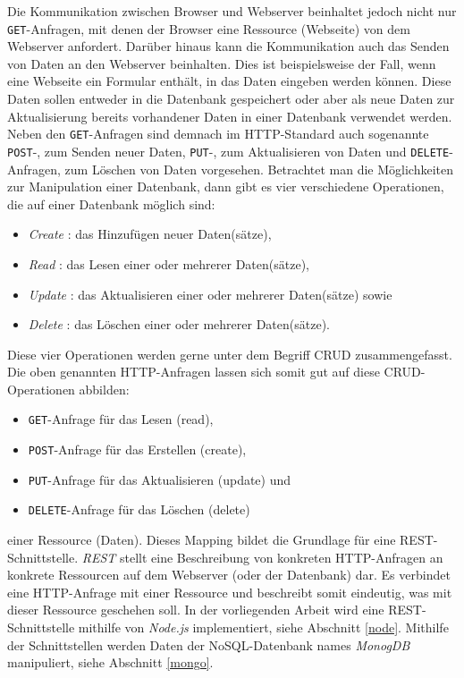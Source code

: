 Die Kommunikation zwischen Browser und Webserver beinhaltet jedoch nicht nur \texttt{GET}-Anfragen, mit denen der Browser eine Ressource (Webseite) von dem Webserver anfordert. Darüber hinaus kann die Kommunikation auch das Senden von Daten an den Webserver beinhalten. Dies ist beispielsweise der Fall, wenn eine Webseite ein Formular enthält, in das Daten eingeben werden können. Diese Daten sollen entweder in die Datenbank gespeichert oder aber als neue Daten zur Aktualisierung bereits vorhandener Daten in einer Datenbank verwendet werden. Neben den \texttt{GET}-Anfragen sind demnach im HTTP-Standard auch sogenannte \texttt{POST}-, zum Senden neuer Daten, \texttt{PUT}-, zum Aktualisieren von Daten und \texttt{DELETE}-Anfragen, zum Löschen von Daten vorgesehen. Betrachtet man die Möglichkeiten zur Manipulation einer Datenbank, dann gibt es vier verschiedene Operationen, die auf einer Datenbank möglich sind:

\begin{itemize}
    \item \textit{Create} : das Hinzufügen neuer Daten(sätze),
    \item \textit{Read} : das Lesen einer oder mehrerer Daten(sätze),
    \item \textit{Update} : das Aktualisieren einer oder mehrerer Daten(sätze) sowie
    \item \textit{Delete} : das Löschen einer oder mehrerer Daten(sätze).
\end{itemize}

Diese vier Operationen werden gerne unter dem Begriff \ac{CRUD} zusammengefasst. Die oben genannten HTTP-Anfragen lassen sich somit gut auf diese CRUD-Operationen abbilden:


\begin{itemize}
    \item \texttt{GET}-Anfrage für das Lesen (read),
    \item \texttt{POST}-Anfrage für das Erstellen (create),
    \item \texttt{PUT}-Anfrage für das Aktualisieren (update) und
    \item \texttt{DELETE}-Anfrage für das Löschen (delete)
\end{itemize}

einer Ressource (Daten). Dieses \glqq Mapping\grqq{} bildet die Grundlage für eine \ac{REST}-Schnittstelle. \textit{REST} stellt eine Beschreibung von konkreten HTTP-Anfragen an konkrete Ressourcen auf dem Webserver (oder der Datenbank) dar. Es verbindet eine HTTP-Anfrage mit einer Ressource und beschreibt somit eindeutig, was mit dieser Ressource geschehen soll. In der vorliegenden Arbeit wird eine REST-Schnittstelle mithilfe von \textit{Node.js} implementiert, siehe Abschnitt \ref{node}. Mithilfe der Schnittstellen werden Daten der \ac{NoSQL}-Datenbank names \textit{MonogDB} manipuliert, siehe Abschnitt \ref{mongo}. 




 
